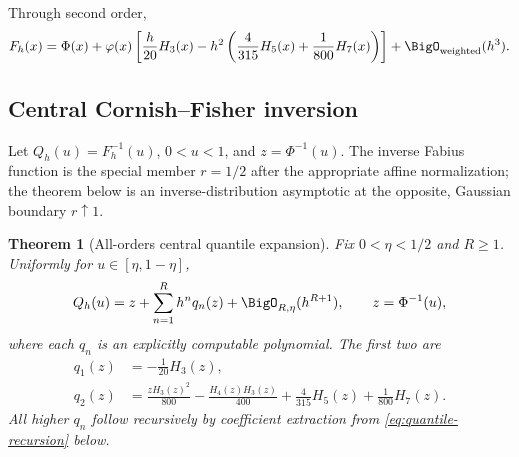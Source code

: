 \documentclass[11pt]{article}
\numberwithin{equation}{section}
\newtheorem{theorem}{Theorem}[section]
\theoremstyle{definition}
\newcommand{\phiN}{\varphi}
\newcommand{\PhiN}{\Phi}
\begin{document}
Through second order,
\begin{equation}\label{eq:cdf-second-order}
 F_h(x)=\PhiN(x)+\phiN(x)\left[
 \frac{h}{20}H_3(x)
 -h^2\left(\frac4{315}H_5(x)+\frac1{800}H_7(x)\right)
 \right]+\BigO_{\mathrm{weighted}}(h^3).
\end{equation}

\subsection{Central Cornish--Fisher inversion}
Let \(Q_h(u)=F_h^{-1}(u)\), \(0<u<1\), and \(z=\PhiN^{-1}(u)\).  The inverse Fabius function is the special member \(r=1/2\) after the appropriate affine normalization; the theorem below is an inverse-distribution asymptotic at the opposite, Gaussian boundary \(r\uparrow1\).

\begin{theorem}[All-orders central quantile expansion]\label{thm:quantile-expansion}
Fix \(0<\eta<1/2\) and \(R\ge1\).  Uniformly for \(u\in[\eta,1-\eta]\),
\begin{equation}\label{eq:quantile-general}
 Q_h(u)=z+\sum_{n=1}^{R}h^nq_n(z)+\BigO_{R,\eta}(h^{R+1}),
 \qquad z=\PhiN^{-1}(u),
\end{equation}
where each \(q_n\) is an explicitly computable polynomial.  The first two are
\begin{align}
 q_1(z)&=-\frac1{20}H_3(z),\label{eq:q1}\\
 q_2(z)&=\frac{zH_3(z)^2}{800}-\frac{H_4(z)H_3(z)}{400}
 +\frac4{315}H_5(z)+\frac1{800}H_7(z).\label{eq:q2}
\end{align}
All higher \(q_n\) follow recursively by coefficient extraction from \eqref{eq:quantile-recursion} below.
\end{theorem}
\end{document}
